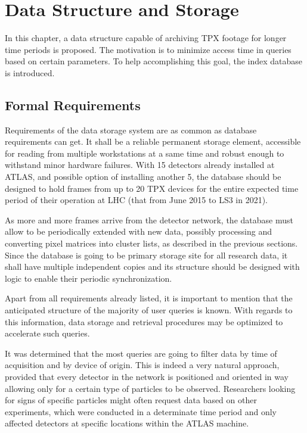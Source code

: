 \chapter{Data Structure and Storage}
In this chapter, a data structure capable of archiving TPX footage for longer time periods is proposed. The motivation is to minimize access time in queries based on certain parameters. To help accomplishing this goal, the index database is introduced.

\section{Formal Requirements}
Requirements of the data storage system are as common as database requirements can get. It shall be a reliable permanent storage element, accessible for reading from multiple workstations at a same time and robust enough to withstand minor hardware failures. With 15 detectors already installed at ATLAS, and possible option of installing another 5, the database should be designed to hold frames from up to 20 TPX devices for the entire expected time period of their operation at LHC (that from June 2015 to LS3 in 2021).

\todo

As more and more frames arrive from the detector network, the database must allow to be periodically extended with new data, possibly processing and converting pixel matrices into cluster lists, as described in the previous sections. Since the database is going to be primary storage site for all research data, it shall have multiple independent copies and its structure should be designed with logic to enable their periodic synchronization.

Apart from all requirements already listed, it is important to mention that the anticipated structure of the majority of user queries is known. With regards to this information, data storage and retrieval procedures may be optimized to accelerate such queries.

It was determined that the most queries are going to filter data by time of acquisition and by device of origin. This is indeed a very natural approach, provided that every detector in the network is positioned and oriented in way allowing only for a certain type of particles to be observed. Researchers looking for signs of specific particles might often request data based on other experiments, which were conducted in a determinate time period and only affected detectors at specific locations within the ATLAS machine.

